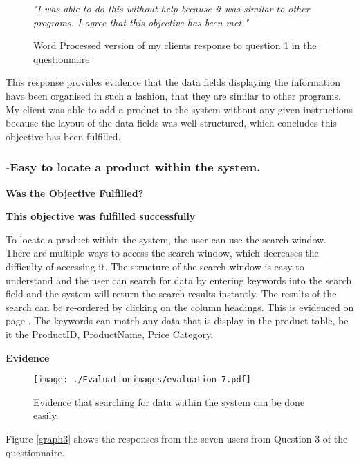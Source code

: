\begin{figure}[H]
\caption{Word Processed version of my clients response to question 1 in the questionnaire} \label{client-evidence-Q1}
\vspace{3mm}
\textit{\large{"I was able to do this without help because it was similar to other programs. I agree that this objective has been met."}}
\vspace{3mm}
\end{figure}

This response provides evidence that the data fields displaying the information have been organised in such a fashion, that they are similar to other programs. My client was able to add a product to the system without any given instructions because the layout of the data fields was well structured, which concludes this objective has been fulfilled.



\pagebreak
\subsubsection{-Easy to locate a product within the system.}
\textbf{Was the Objective Fulfilled?} \newline

\textbf{\large{This objective was fulfilled successfully}}

To locate a product within the system, the user can use the search window. There are multiple ways to access the search window, which decreases the difficulty of accessing it. The structure of the search window is easy to understand and the user can search for data by entering keywords into the search field and the system will return the search results instantly. The results of the search can be re-ordered by clicking on the column headings. This is evidenced on page \pageref{}. The keywords can match any data that is display in the product table, be it the ProductID, ProductName, Price Category.\newline

\textbf{Evidence} \newline

\begin{figure}[H]
\caption{Evidence that searching for data within the system can be done easily.} \label{fig:evaluation-7}
\hfill\texttt{[image: ./Evaluationimages/evaluation-7.pdf]}
\end{figure}

\pagebreak

Figure \ref{graph3} shows the responses from the seven users from Question 3 of the questionnaire.

